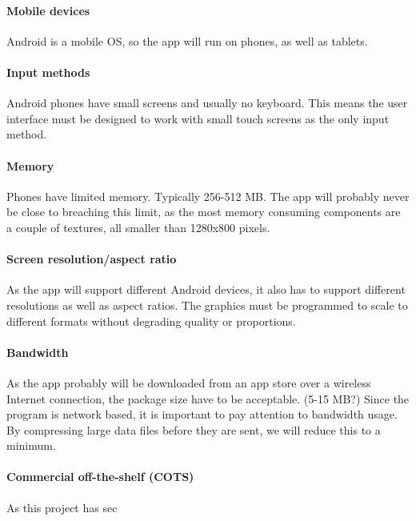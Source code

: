 \paragraph{Mobile devices} \hfill
\newline
Android is a mobile OS, so the app will run on phones, as well as tablets.

\paragraph{Input methods} \hfill
\newline
Android phones have small screens and usually no keyboard. This means the user interface must be designed to work with small touch screens as the only input method.

\paragraph{Memory}\hfill
\newline
Phones have limited memory. Typically 256-512 MB. The app will probably never be close to breaching this limit, as the most memory consuming components are a couple of textures, all smaller than 1280x800 pixels.

\paragraph{Screen resolution/aspect ratio} \hfill
\newline
As the app will support different Android devices, it also has to support different resolutions as well as aspect ratios. The graphics must be programmed to scale to different formats without degrading quality or proportions.

\paragraph{Bandwidth} \hfill
\newline
As the app probably will be downloaded from an app store over a wireless Internet connection, the package size have to be acceptable. (5-15 MB?)
\newline
Since the program is network based, it is important to pay attention to bandwidth usage. By compressing large data files before they are sent, we will reduce this to a minimum.

\paragraph{Commercial off-the-shelf (COTS)} \hfill
\newline
As this project has sec


